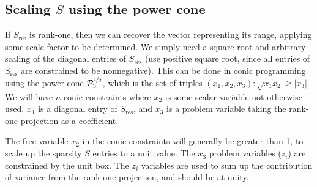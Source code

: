 \documentclass{article}
\begin{document}






\subsection{Scaling $S$ using the power cone}

If $S_\text{res}$ is rank-one, then we can recover the vector representing its range, applying some scale factor to be determined. We simply need a square root and arbitrary scaling of the diagonal entries of $S_\text{res}$ (use positive square root, since all entries of $S_\text{res}$ are constrained to be nonnegative). This can be done in conic programming using the power cone $\mathcal{P}_3^{\nicefrac{1}{2}}$, which is the set of triples $(x_1,x_2,x_3) : \sqrt{x_1x_2} \ge |x_3|$. We will have $n$ conic constraints where $x_2$ is some scalar variable not otherwise used, $x_1$ is a diagonal entry of $S_\text{res}$, and $x_3$ is a problem variable taking the rank-one projection as a coefficient.

The free variable $x_2$ in the conic constraints will generally be greater than 1, to scale up the sparsity $S$ entries to a unit value. The $x_3$ problem variables ($z_i$) are constrained by the unit box. The $z_i$ variables are used to sum up the contribution of variance from the rank-one projection, and should be at unity.
\end{document}
